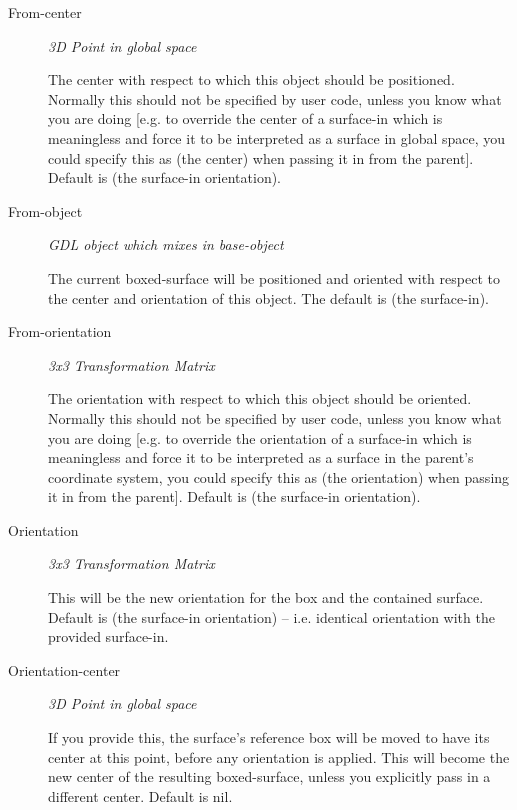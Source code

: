 \documentclass [11pt]{book}
\begin{document}
\begin{itemize}
\begin{description}
\item [From-center]
\emph{3D Point in global space}

 The center with respect to which this object should be positioned. Normally
this should not be specified by user code, unless you know what you are doing [e.g. to override the center
of a surface-in which is meaningless and force it to be interpreted as a surface in global space, you could
specify this as (the center) when passing it in from the parent]. Default is (the surface-in orientation).




\item [From-object]
\emph{GDL object which mixes in base-object}

 The current boxed-surface will be positioned and oriented with respect
to the center and orientation of this object. The default is (the surface-in).




\item [From-orientation]
\emph{3x3 Transformation Matrix}

 The orientation with respect to which this object should be oriented. Normally
this should not be specified by user code, unless you know what you are doing [e.g. to override the orientation
of a surface-in which is meaningless and force it to be interpreted as a surface in the parent's coordinate system,
you could specify this as (the orientation) when passing it in from the parent]. Default is (the surface-in orientation).




\item [Orientation]
\emph{3x3 Transformation Matrix}

 This will be the new orientation for the box and the contained surface. Default is
(the surface-in orientation) -- i.e. identical orientation with the provided surface-in.




\item [Orientation-center]
\emph{3D Point in global space}

 If you provide this, the surface's reference box will be moved to have its center
at this point, before any orientation is applied. This will become the new center of the resulting boxed-surface,
unless you explicitly pass in a different center. Default is nil.





\end{description}
\end{itemize}
\end{document}
